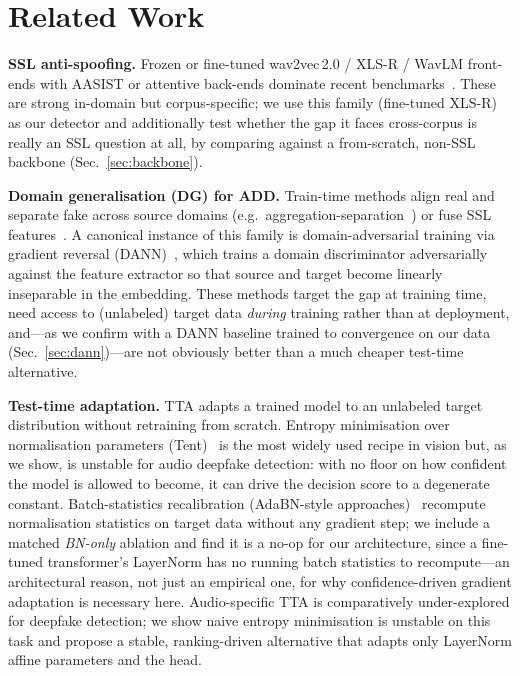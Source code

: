 \documentclass[conference]{IEEEtran}
\begin{document}
\section{Related Work}
\textbf{SSL anti-spoofing.} Frozen or fine-tuned wav2vec\,2.0 / XLS-R / WavLM
front-ends with AASIST or attentive back-ends dominate recent
benchmarks~\cite{wav2vec2aug,xlsrsls,aasist,rawnet2}. These are strong in-domain
but corpus-specific; we use this family (fine-tuned XLS-R) as our detector and
additionally test whether the gap it faces cross-corpus is really an SSL
question at all, by comparing against a from-scratch, non-SSL backbone
(Sec.~\ref{sec:backbone}).

\textbf{Domain generalisation (DG) for ADD.} Train-time methods align real and
separate fake across source domains (e.g.\ aggregation-separation~\cite{asdg}) or
fuse SSL features~\cite{crossdomain}. A canonical instance of this family is
domain-adversarial training via gradient reversal (DANN)~\cite{dann}, which
trains a domain discriminator adversarially against the feature extractor so
that source and target become linearly inseparable in the embedding. These
methods target the gap at training time, need access to (unlabeled) target data
\emph{during} training rather than at deployment, and---as we confirm with a
DANN baseline trained to convergence on our data (Sec.~\ref{sec:dann})---are not
obviously better than a much cheaper test-time alternative.

\textbf{Test-time adaptation.} TTA adapts a trained model to an unlabeled target
distribution without retraining from scratch. Entropy minimisation over
normalisation parameters (Tent)~\cite{tent} is the most widely used recipe in
vision but, as we show, is unstable for audio deepfake detection: with no
floor on how confident the model is allowed to become, it can drive the
decision score to a degenerate constant. Batch-statistics recalibration
(AdaBN-style approaches)~\cite{adabn} recompute normalisation statistics on
target data without any gradient step; we include a matched \emph{BN-only}
ablation and find it is a no-op for our architecture, since a fine-tuned
transformer's LayerNorm has no running batch statistics to recompute---an
architectural reason, not just an empirical one, for why confidence-driven
gradient adaptation is necessary here. Audio-specific TTA is comparatively
under-explored for deepfake detection; we show naive entropy minimisation is
unstable on this task and propose a stable, ranking-driven alternative that
adapts only LayerNorm affine parameters and the head.
\end{document}
